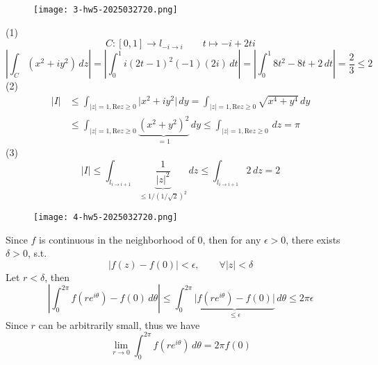 \begin{exercise}
\begin{figure}[H]
\centering
\texttt{[image: 3-hw5-2025032720.png]}
\label{}
\end{figure}
\end{exercise}
(1)
\[
C:[0,1]\to l_{-i\to i}\qquad t\mapsto-i+2ti
\]
\[
\left\lvert  \int_{C}^{} (x^2+iy^2) \, dz   \right\rvert=\left\lvert  \int_{0}^{1} i(2t-1)^2(-1)(2i) \, dt   \right\rvert =\left\lvert  \int_{0}^{1} 8t^2-8t+2 \, dt  \right\rvert =\frac{2}{3}\leq 2
\]
(2)
\[
\begin{aligned}
\lvert I \rvert  & \leq \int_{\lvert z \rvert =1,\mathrm{Re}z\geq 0}^{} \lvert x^2+iy^2 \rvert  \, dy =\int_{\lvert z \rvert =1,\mathrm{Re}z\geq 0}^{} \sqrt{ x^{4}+y^{4} } \, dy \\
 & \leq \int_{\lvert z \rvert =1,\mathrm{Re}z\geq 0}^{} \underbrace{ (x^2+y^2)^2 }_{ =1 } \, dy\leq \int_{\lvert z \rvert =1,\mathrm{Re}z\geq 0}^{}  \, dz=\pi
\end{aligned}
\]
(3)
\[
\lvert I \rvert \leq \int_{l_{i\to i+1}}^{} \underbrace{ \frac{1}{\lvert z \rvert ^2} }_{ \leq 1/(1/\sqrt{ 2 })^2 }   \, dz \leq \int_{l_{i\to i+1}}^{} 2 \, dz=2
\]
\begin{exercise}
\begin{figure}[H]
\centering
\texttt{[image: 4-hw5-2025032720.png]}
\label{}
\end{figure}
\end{exercise}
Since $f$ is continuous in the neighborhood of 0, then for any $\epsilon>0$, there exists $\delta>0$, s.t.
\[
\lvert f(z)-f(0) \rvert <\epsilon,\qquad \forall \lvert z \rvert <\delta
\]
Let $r<\delta$, then
\[
\left\lvert  \int_{0}^{2\pi} f(re^{ i\theta })-f(0)  \, d\theta  \right\rvert\leq \int_{0}^{2\pi} \underbrace{ \lvert f(re^{ i\theta })-f(0) \rvert }_{ \leq \epsilon }  \, d\theta\leq 2\pi\epsilon 
\]
Since $r$ can be arbitrarily small, thus we have
\[
\lim_{ r \to 0 } \int_{0}^{2\pi} f(re^{ i\theta }) \, d\theta=2\pi f(0)
\]